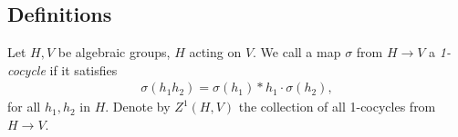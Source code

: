 % 

\subsection{Definitions}
Let $H, V$ be algebraic groups, $H$ acting on $V$. We call a map $\sigma$ from $H\rightarrow V$ a  \emph{1-cocycle} if it satisfies
\begin{eqnarray}\label{ch4::theNonabOneCocycleCondition}
	\sigma(h_1h_2) = \sigma(h_1) * h_1\cdot\sigma(h_2),
\end{eqnarray}
for all $h_1, h_2$ in $H$. Denote by $Z^1\left( H, V \right)$ the collection of all 1-cocycles from $H\rightarrow V$.

